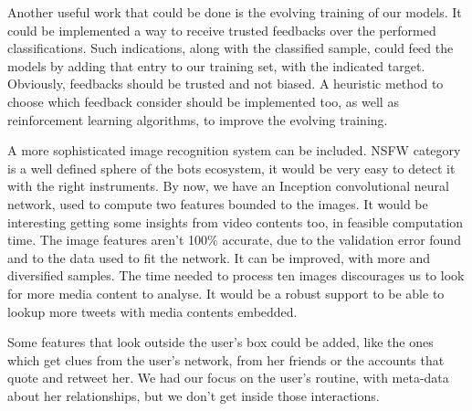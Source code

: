 Another useful work that could be done is the evolving training of our models. It could be implemented a way to receive trusted feedbacks over the performed classifications. Such indications, along with the classified sample, could feed the models by adding that entry to our training set, with the indicated target. Obviously, feedbacks should be trusted and not biased. A heuristic method to choose which feedback consider should be implemented too, as well as reinforcement learning algorithms, to improve the evolving training.

A more sophisticated image recognition system can be included. NSFW category is a well defined sphere of the bots ecosystem, it would be very easy to detect it with the right instruments. By now, we have an Inception convolutional neural network, used to compute two features bounded to the images. It would be interesting getting some insights from video contents too, in feasible computation time. The image features aren't 100\% accurate, due to the validation error found and to the data used to fit the network. It can be improved, with more and diversified samples. The time needed to process ten images discourages us to look for more media content to analyse. It would be a robust support to be able to lookup more tweets with media contents embedded.

Some features that look outside the user's box could be added, like the ones which get clues from the user's network, from her friends or the accounts that quote and retweet her. We had our focus on the user's routine, with meta-data about her relationships, but we don't get inside those interactions.                



